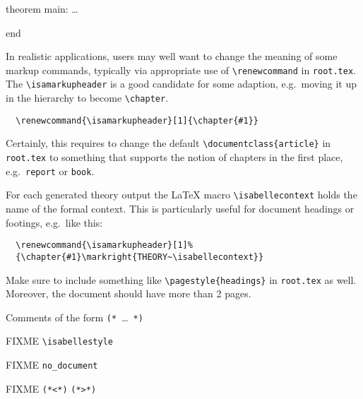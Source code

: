 \begin{isabellebody}
\begin{isamarkuptext}
\begin{ttbox}
  theorem main: \dots

  end
  \end{ttbox}

  \medskip In realistic applications, users may well want to change
  the meaning of some markup commands, typically via appropriate use
  of \verb,\renewcommand, in \texttt{root.tex}.  The
  \verb,\isamarkupheader, is a good candidate for some adaption, e.g.\
  moving it up in the hierarchy to become \verb,\chapter,.

\begin{verbatim}
  \renewcommand{\isamarkupheader}[1]{\chapter{#1}}
\end{verbatim}

  Certainly, this requires to change the default
  \verb,\documentclass{article}, in \texttt{root.tex} to something
  that supports the notion of chapters in the first place, e.g.\
  \texttt{report} or \texttt{book}.

  \medskip For each generated theory output the {\LaTeX} macro
  \verb,\isabellecontext, holds the name of the formal context.  This
  is particularly useful for document headings or footings, e.g.\ like
  this:

\begin{verbatim}
  \renewcommand{\isamarkupheader}[1]%
  {\chapter{#1}\markright{THEORY~\isabellecontext}}
\end{verbatim}

  \noindent Make sure to include something like
  \verb,\pagestyle{headings}, in \texttt{root.tex} as well.  Moreover,
  the document should have more than 2 pages.%
\end{isamarkuptext}%
\isamarkuptrue%
%
\isamarkuptrue%
%
\begin{isamarkuptext}%
Comments of the form \verb,(*,~\dots~\verb,*),%
\end{isamarkuptext}%
\isamarkuptrue%
%
\isamarkuptrue%
%
\begin{isamarkuptext}%
FIXME \verb,\isabellestyle,%
\end{isamarkuptext}%
\isamarkuptrue%
%
\isamarkuptrue%
%
\begin{isamarkuptext}%
FIXME \verb,no_document,

  FIXME \verb,(,\verb,*,\verb,<,\verb,*,\verb,),
  \verb,(,\verb,*,\verb,>,\verb,*,\verb,),%
\end{isamarkuptext}%
\isamarkuptrue%
\isamarkupfalse%
\end{isabellebody}%

